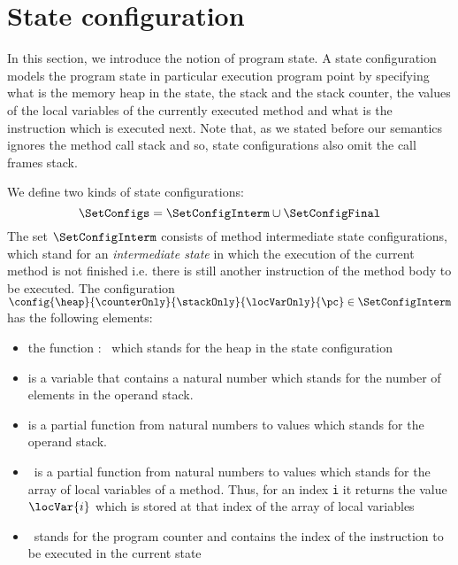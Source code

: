 
\newtheorem{StateProp0}{Substitution Property for Expressions}
\newtheorem{StateProp1}[StateProp0]{Substitution Property for Formulas}
\newtheorem{UpdateStateSem}[StateProp0]{Definition}


\newtheorem{AtState}{Definition}


\newtheorem{FormulaInterp}[AtState]{Definition}
\newtheorem{StateProp2}[AtState]{Substitution Property for Field Functions } %


\section{State configuration}\label{def}
 In this section, we introduce the notion of program state.
 A state configuration \SetConfigs models the program state in particular execution
 program point by specifying what is the memory heap in the state, the stack and the stack counter, the values of the
 local variables of the currently executed method  and what is the instruction which is executed next. Note that, as we stated before our 
 semantics ignores the method call stack and so, state configurations also omit the call frames stack. 
 
 We define two kinds of state configurations:
 $$\SetConfigs = \SetConfigInterm \cup \SetConfigFinal$$
 The set $\SetConfigInterm$ consists of method intermediate state configurations, which stand for an 
 \textit{intermediate state} in which the execution of the current method is not finished i.e.
 there is still another instruction of the method body to be executed.  
 The configuration $\config{\heap}{\counterOnly}{\stackOnly}{\locVarOnly}{\pc} \in \SetConfigInterm$ has the following elements:
               \begin{itemize}
                     \item the function \heap : \HeapSet \ which stands for the heap in the state configuration
	   
	             \item \counterOnly is a variable that contains a natural number which stands for the number of
		     elements in the operand stack.  

		     \item \stackOnly is a partial function from natural numbers to values  which  stands for 
		     the operand stack.

	             \item \locVarOnly \ is a partial function from natural numbers to values which stands for
		     the array of local variables of a method.
		     Thus,  for an index \texttt{i} it returns the value $\locVar{i}$ which is stored at that 
		     index of the array of local variables
	
	            \item \pc \ stands for the program counter and contains the index of the instruction to be executed in the current state
	        \end{itemize}


